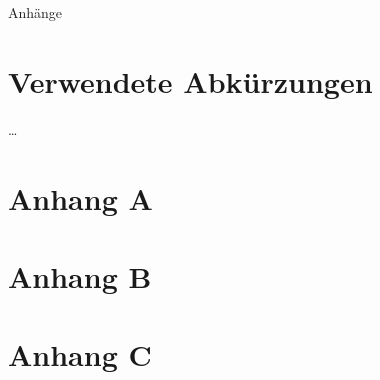 ﻿\documentclass[a4paper,12pt,fleqn]{scrartcl}
\begin{document}
\begin{appendix}
\newpage
\huge{Anhänge}
\thispagestyle{plain}
\section{Verwendete Abkürzungen}
\dots{}

\newpage
\thispagestyle{plain}
\section[AppendixA]{Anhang A}
\label{sec:greetings}

\newpage
\thispagestyle{plain}
\section[AppendixB]{Anhang B}

\newpage
\thispagestyle{plain}
\section[AppendixC]{Anhang C}

\end{appendix}
\end{document}
